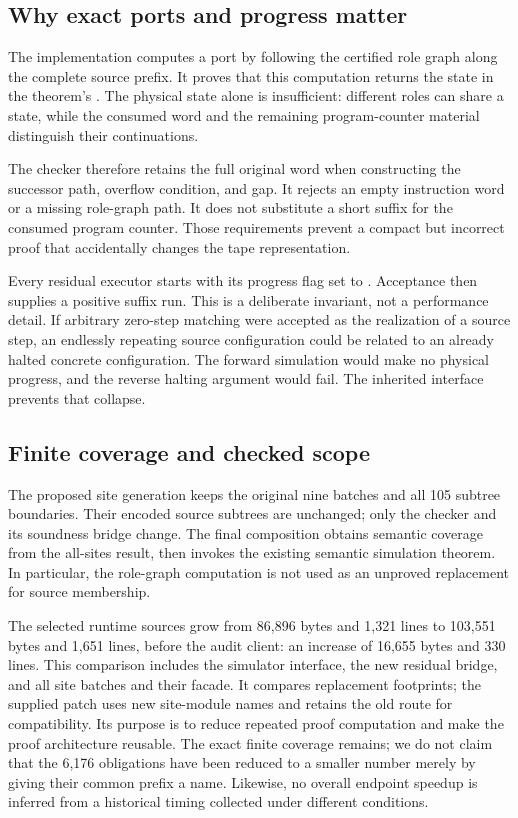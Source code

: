 \documentclass[11pt,letterpaper]{article}
\newcommand{\code}[1]{\texttt{\small\detokenize{#1}}}
\begin{document}
\subsection{Why exact ports and progress matter}

The implementation computes a port by following the certified role graph along
the complete source prefix. It proves that this computation returns the state
in the theorem's \code{RoutedEntry}. The physical state alone is insufficient:
different roles can share a state, while the consumed word and the remaining
program-counter material distinguish their continuations.

The checker therefore retains the full original word when constructing the
successor path, overflow condition, and gap. It rejects an empty instruction
word or a missing role-graph path. It does not substitute a short suffix for
the consumed program counter. Those requirements prevent a compact but
incorrect proof that accidentally changes the tape representation.

Every residual executor starts with its progress flag set to \code{false}.
Acceptance then supplies a positive suffix run. This is a deliberate invariant,
not a performance detail. If arbitrary zero-step matching were accepted as
the realization of a source step, an endlessly repeating source configuration
could be related to an already halted concrete configuration. The forward
simulation would make no physical progress, and the reverse halting argument
would fail. The inherited \code{Reach1} interface prevents that collapse.

\subsection{Finite coverage and checked scope}

The proposed site generation keeps the original nine batches and all 105
subtree boundaries. Their encoded source subtrees are unchanged; only the
checker and its soundness bridge change. The final composition obtains
semantic coverage from the all-sites result, then invokes the existing
semantic simulation theorem. In particular, the role-graph computation is not
used as an unproved replacement for source membership.

\ResidualValidationText

The selected runtime sources grow from 86,896 bytes and 1,321 lines to
103,551 bytes and 1,651 lines, before the audit client: an increase of
16,655 bytes and 330 lines. This comparison includes the simulator interface,
the new residual bridge, and all site batches and their facade. It compares
replacement footprints; the supplied patch uses new site-module names and
retains the old route for compatibility. Its purpose is to reduce repeated proof computation
and make the proof architecture reusable. The exact finite coverage remains;
we do not claim that the 6,176 obligations have been reduced to a smaller
number merely by giving their common prefix a name. Likewise, no overall
endpoint speedup is inferred from a historical timing collected under different
conditions.
\end{document}
